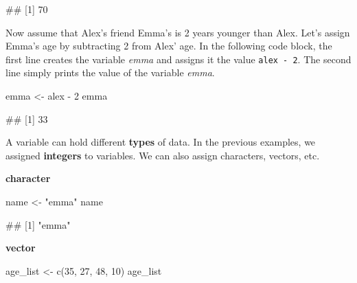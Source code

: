 \documentclass[
]{book}
\newenvironment{Shaded}{\begin{snugshade}}{\end{snugshade}}
\newcommand{\DecValTok}[1]{\textcolor[rgb]{0.00,0.00,0.81}{#1}}
\newcommand{\FunctionTok}[1]{\textcolor[rgb]{0.00,0.00,0.00}{#1}}
\newcommand{\NormalTok}[1]{#1}
\newcommand{\OtherTok}[1]{\textcolor[rgb]{0.56,0.35,0.01}{#1}}
\newcommand{\SpecialCharTok}[1]{\textcolor[rgb]{0.00,0.00,0.00}{#1}}
\newcommand{\StringTok}[1]{\textcolor[rgb]{0.31,0.60,0.02}{#1}}
\begin{document}
\begin{Shaded}
\begin{Highlighting}[]
\NormalTok{\#\# [1] 70}
\end{Highlighting}
\end{Shaded}

Now assume that Alex's friend Emma's is 2 years younger than Alex. Let's assign Emma's age by subtracting 2 from Alex' age. In the following code block, the first line creates the variable \emph{emma} and assigns it the value \texttt{alex\ -\ 2}. The second line simply prints the value of the variable \emph{emma}.

\begin{Shaded}
\begin{Highlighting}[]
\NormalTok{emma }\OtherTok{\textless{}{-}}\NormalTok{ alex }\SpecialCharTok{{-}} \DecValTok{2}
\NormalTok{emma}
\end{Highlighting}
\end{Shaded}

\begin{Shaded}
\begin{Highlighting}[]
\NormalTok{\#\# [1] 33}
\end{Highlighting}
\end{Shaded}

A variable can hold different \textbf{types} of data. In the previous examples, we assigned \textbf{integers} to variables. We can also assign characters, vectors, etc.

\textbf{character}

\begin{Shaded}
\begin{Highlighting}[]
\NormalTok{name }\OtherTok{\textless{}{-}} \StringTok{"emma"}
\NormalTok{name}
\end{Highlighting}
\end{Shaded}

\begin{Shaded}
\begin{Highlighting}[]
\NormalTok{\#\# [1] "emma"}
\end{Highlighting}
\end{Shaded}

\textbf{vector}

\begin{Shaded}
\begin{Highlighting}[]
\NormalTok{age\_list }\OtherTok{\textless{}{-}} \FunctionTok{c}\NormalTok{(}\DecValTok{35}\NormalTok{, }\DecValTok{27}\NormalTok{, }\DecValTok{48}\NormalTok{, }\DecValTok{10}\NormalTok{)}
\NormalTok{age\_list}
\end{Highlighting}
\end{Shaded}
\end{document}
